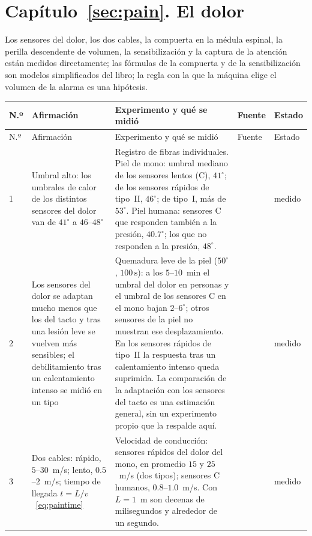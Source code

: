 \section{Capítulo~\ref{sec:pain}. El dolor}

Los sensores del dolor, los dos cables, la compuerta en la médula espinal, la perilla descendente de volumen, la sensibilización y la captura de la atención están medidos directamente; las fórmulas de la compuerta y de la sensibilización son modelos simplificados del libro; la regla con la que la máquina elige el volumen de la alarma es una hipótesis.

{\footnotesize
\setlength{\tabcolsep}{3pt}\renewcommand{\arraystretch}{1.15}
\begin{longtable}{>{\raggedright}p{0.5cm}>{\raggedright}p{4.0cm}>{\raggedright}p{5.6cm}>{\raggedright}p{2.3cm}>{\raggedright\arraybackslash}p{1.7cm}}
\toprule
N.º & Afirmación & Experimento y qué se midió & Fuente & Estado \\
\midrule\endfirsthead
\toprule
N.º & Afirmación & Experimento y qué se midió & Fuente & Estado \\
\midrule\endhead
1 & Umbral alto: los umbrales de calor de los distintos sensores del dolor van de $41^\circ$ a $46$--$48^\circ$ & Registro de fibras individuales. Piel de mono: umbral mediano de los sensores lentos (C), $41^\circ$; de los sensores rápidos de tipo~II, $46^\circ$; de tipo~I, más de $53^\circ$. Piel humana: sensores C que responden también a la presión, $40.7^\circ$; los que no responden a la presión, $48^\circ$. & \cite{Treede1995heat, Weidner1999cfib} & medido \\
2 & Los sensores del dolor se adaptan mucho menos que los del tacto y tras una lesión leve se vuelven más sensibles; el debilitamiento tras un calentamiento intenso se midió en un tipo & Quemadura leve de la piel ($50^\circ$, $100\,\text{s}$): a los $5$--$10$~min el umbral del dolor en personas y el umbral de los sensores C en el mono bajan $2$--$6^\circ$; otros sensores de la piel no muestran ese desplazamiento. En los sensores rápidos de tipo~II la respuesta tras un calentamiento intenso queda suprimida. La comparación de la adaptación con los sensores del tacto es una estimación general, sin un experimento propio que la respalde aquí. & \cite{LaMotte1982hyper, Treede1995heat} & medido \\
3 & Dos cables: rápido, $5$--$30$~m/s; lento, $0.5$--$2$~m/s; tiempo de llegada $t=L/v$~\eqref{eq:paintime} & Velocidad de conducción: sensores rápidos del dolor del mono, en promedio $15$ y $25$~m/s (dos tipos); sensores C humanos, $0.8$--$1.0$~m/s. Con $L=1$~m son decenas de milisegundos y alrededor de un segundo. & \cite{Treede1995heat, Weidner1999cfib} & medido \\

\end{longtable}}

